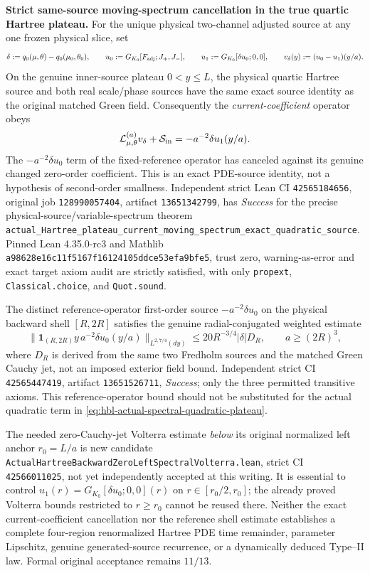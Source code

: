 \documentclass[11pt]{amsart}
\begin{document}
\medskip
\noindent\textbf{Strict same-source moving-spectrum cancellation in the true quartic Hartree plateau.}
For the unique physical two-channel adjusted source at any one frozen
physical slice, set
\[
  \delta:=q_0(\mu,\theta)-q_0(\mu_0,\theta_0),\qquad
  u_0:=G_{K_0}[F_{\rm adj};J_+,J_-],\qquad
  u_1:=G_{K_0}[\delta u_0;0,0],\qquad
  v_\delta(y):=(u_0-u_1)(y/a).
\]
On the genuine inner-source plateau \(0<y\le L\), the physical
quartic Hartree source and both real scale/phase sources have the
same exact source identity as the original matched Green field.
Consequently the \emph{current-coefficient} operator obeys
\begin{equation}
  \mathcal L_{\mu,\theta}^{(a)}v_\delta
   +\mathcal S_{\rm in}
     =-a^{-2}\delta u_1(y/a).
\label{eq:hbl-actual-spectral-quadratic-plateau}
\end{equation}
The \(-a^{-2}\delta u_0\) term of the fixed-reference operator
has canceled against its genuine changed zero-order coefficient.
This is an exact PDE-source identity, not a hypothesis of second-order
smallness.  Independent strict Lean CI \texttt{42565184656},
original job \texttt{128990057404}, artifact \texttt{13651342799},
has \emph{Success} for the precise physical-source/variable-spectrum
theorem
\texttt{actual\_Hartree\_plateau\_current\_moving\_spectrum\_exact\_quadratic\_source}.
Pinned Lean 4.35.0-rc3 and Mathlib
\texttt{a98628e16c11f5167f16124105ddce53efa9bfe5},
trust zero, warning-as-error and exact target axiom audit are
strictly satisfied, with only \texttt{propext},
\texttt{Classical.choice}, and \texttt{Quot.sound}.

The distinct reference-operator first-order source
\(-a^{-2}\delta u_0\) on the physical backward shell
\([R,2R]\) satisfies the genuine radial-conjugated weighted
estimate
\[
 \|\mathbf 1_{(R,2R)}y\,a^{-2}\delta u_0(y/a)\|_{L^{2,7/4}(dy)}
   \le 20R^{-3/4}|\delta|D_R,\qquad a\ge(2R)^3,
\]
where \(D_R\) is derived from the same two Fredholm sources
and the matched Green Cauchy jet, not an imposed exterior field bound.
Independent strict CI \texttt{42565447419}, artifact
\texttt{13651526711}, \emph{Success}; only the three permitted
transitive axioms.  This reference-operator bound should not be
substituted for the actual quadratic term in
\eqref{eq:hbl-actual-spectral-quadratic-plateau}.

The needed zero-Cauchy-jet Volterra estimate \emph{below} its
original normalized left anchor \(r_0=L/a\) is new candidate
\texttt{ActualHartreeBackwardZeroLeftSpectralVolterra.lean},
strict CI \texttt{42566011025}, not yet independently accepted
at this writing.  It is essential to control
\(u_1(r)=G_{K_0}[\delta u_0;0,0](r)\)
on \(r\in[r_0/2,r_0]\); the already proved Volterra bounds
restricted to \(r\ge r_0\) cannot be reused there.
Neither the exact current-coefficient cancellation nor the
reference shell estimate establishes a complete four-region
renormalized Hartree PDE time remainder, parameter Lipschitz,
genuine generated-source recurrence, or a dynamically deduced
Type--II law.  Formal original acceptance remains \(11/13\).
\end{document}
